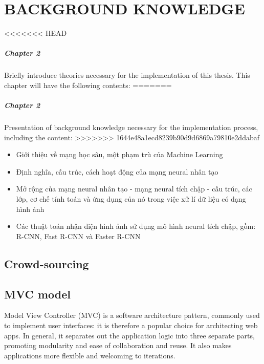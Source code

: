 \chapter{BACKGROUND KNOWLEDGE}
\label{chap:background}
<<<<<<< HEAD
\paragraph{Chapter 2} Briefly introduce theories necessary for the implementation of this thesis. This chapter will have the following contents:
=======
\paragraph{Chapter 2} Presentation of background knowledge necessary for the implementation process, including the content:
>>>>>>> 1644e48a1ecd8239b90d9d6869a79810e2ddabaf

\begin{itemize}
\item Giới thiệu về mạng học sâu, một phạm trù của Machine Learning

\item Định nghĩa, cấu trúc, cách hoạt động của mạng neural nhân tạo

\item Mở rộng của mạng neural nhân tạo - mạng neural tích chập - cấu trúc, các lớp, cơ chế tính toán và ứng dụng của nó trong việc xử lí dữ liệu có dạng hình ảnh

\item Các thuật toán nhận diện hình ảnh sử dụng mô hình neural tích chập, gồm: R-CNN, Fast R-CNN và Faster R-CNN
\end{itemize}

\section{Crowd-sourcing}

\section{MVC model}
Model View Controller (MVC) is a software architecture pattern, commonly used to implement user interfaces: it is therefore a popular choice for architecting web apps. In general, it separates out the application logic into three separate parts, promoting modularity and ease of collaboration and reuse. It also makes applications more flexible and welcoming to iterations.

